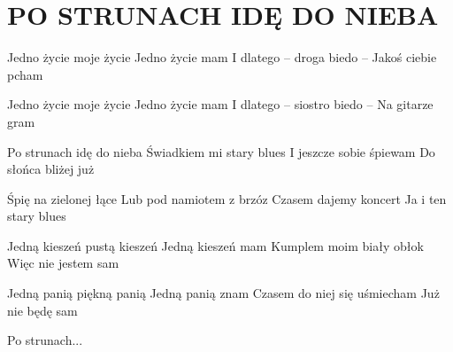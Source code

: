 \documentclass[../../../songbook.tex]{subfiles}
\begin{document}
\TabPositions{8cm} %
\section*{PO STRUNACH IDĘ DO NIEBA}
{}
\vspace{0.5cm}
Jedno życie moje życie 		 \newline
Jedno życie mam 			 \newline
I dlatego – droga biedo – 	 \newline
Jakoś ciebie pcham 			 \newline

Jedno życie moje życie 		 \newline
Jedno życie mam 			 \newline
I dlatego – siostro biedo –  \newline
Na gitarze gram 			 \newline

\-\hspace{1cm} Po strunach idę do nieba 	 \newline
\-\hspace{1cm} Świadkiem mi stary blues 	 \newline
\-\hspace{1cm} I jeszcze sobie śpiewam 		 \newline
\-\hspace{1cm} Do słońca bliżej już 		 \newline

\-\hspace{1cm} Śpię na zielonej łące 		 \newline
\-\hspace{1cm} Lub pod namiotem z brzóz 	 \newline
\-\hspace{1cm} Czasem dajemy koncert 		 \newline
\-\hspace{1cm} Ja i ten stary blues 		 \newline

Jedną kieszeń pustą kieszeń \newline
Jedną kieszeń mam \newline
Kumplem moim biały obłok \newline
Więc nie jestem sam \newline

Jedną panią piękną panią \newline
Jedną panią znam \newline
Czasem do niej się uśmiecham \newline
Już nie będę sam \newline

\-\hspace{1cm} Po strunach... \newline
\end{document}
